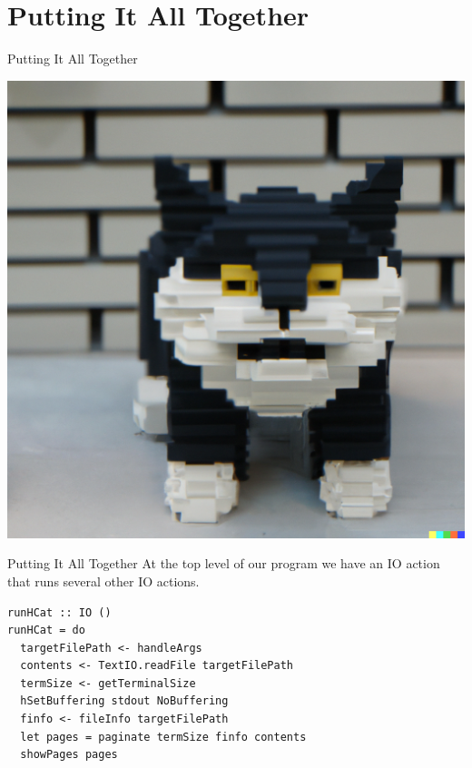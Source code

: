 \documentclass[10pt, presentation, colorlinks]{beamer}
\begin{document}
\section{Putting It All Together}
\label{sec:org10155dc}

\begin{frame}[label={sec:orgb4066dc}]{Putting It All Together}
\begin{center}
\includegraphics[height=0.5\textheight]{img/cat.png}
\end{center}
\end{frame}

\begin{frame}[label={sec:orgbe1f0ef},fragile]{Putting It All Together}
 At the top level of our program we have an IO action that runs several
other IO actions.

\begin{verbatim}
runHCat :: IO ()
runHCat = do
  targetFilePath <- handleArgs
  contents <- TextIO.readFile targetFilePath
  termSize <- getTerminalSize
  hSetBuffering stdout NoBuffering
  finfo <- fileInfo targetFilePath
  let pages = paginate termSize finfo contents
  showPages pages
\end{verbatim}
\end{frame}
\end{document}
